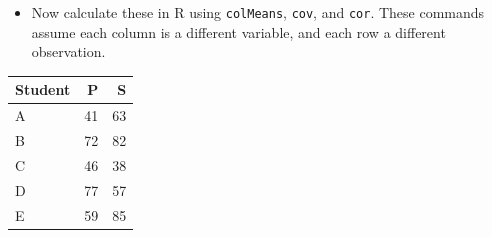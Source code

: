\documentclass[]{book}
\newenvironment{Shaded}{\begin{snugshade}}{\end{snugshade}}
\newcommand{\DataTypeTok}[1]{\textcolor[rgb]{0.13,0.29,0.53}{#1}}
\newcommand{\DecValTok}[1]{\textcolor[rgb]{0.00,0.00,0.81}{#1}}
\newcommand{\KeywordTok}[1]{\textcolor[rgb]{0.13,0.29,0.53}{\textbf{#1}}}
\newcommand{\NormalTok}[1]{#1}
\newcommand{\OperatorTok}[1]{\textcolor[rgb]{0.81,0.36,0.00}{\textbf{#1}}}
\newcommand{\OtherTok}[1]{\textcolor[rgb]{0.56,0.35,0.01}{#1}}
\newcommand{\StringTok}[1]{\textcolor[rgb]{0.31,0.60,0.02}{#1}}
\providecommand{\tightlist}{%
  \setlength{\itemsep}{0pt}\setlength{\parskip}{0pt}}
\theoremstyle{definition}
\theoremstyle{definition}
\theoremstyle{definition}
\theoremstyle{remark}
\begin{document}
\begin{itemize}
\tightlist
\item
  Now calculate these in R using \texttt{colMeans}, \texttt{cov}, and \texttt{cor}. These commands assume each column is a different variable, and each row a different observation.
\end{itemize}

\begin{Shaded}
\end{Shaded}

\begin{table}[H]
\centering
\begin{tabular}{lrr}
\toprule
Student & P & S\\
\midrule
A & 41 & 63\\
B & 72 & 82\\
C & 46 & 38\\
D & 77 & 57\\
E & 59 & 85\\
\bottomrule
\end{tabular}
\end{table}

\begin{Shaded}
\end{Shaded}
\end{document}
